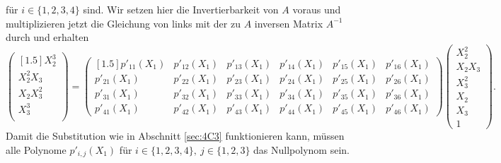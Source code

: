 \documentclass[a4paper,oneside, 11pt, openany%
]{article}
\theoremstyle{custom}
\theoremstyle{custom}
\begin{document}
für $i\in \{1,2,3,4\}$ sind.
Wir setzen hier die Invertierbarkeit von $A$ voraus und multiplizieren jetzt die Gleichung von links mit der zu $A$ inversen Matrix $A^{-1}$ durch und erhalten
\begin{equation*}
	\begin{pmatrix}[1.5]
		X_{2}^3\\
		X_{2}^2X_{3}\\
		X_{2}X_{3}^2\\
		X_{3}^3\\
	\end{pmatrix}
	=
	\begin{pmatrix}[1.5]
		p'_{11}(X_{1})&p'_{12}(X_{1})& p'_{13}(X_{1})& p'_{14}(X_{1})& p'_{15}(X_{1})& p'_{16}(X_{1})\\
		p'_{21}(X_{1})&p'_{22}(X_{1})& p'_{23}(X_{1})& p'_{24}(X_{1})& p'_{25}(X_{1})& p'_{26}(X_{1})\\
		p'_{31}(X_{1})&p'_{32}(X_{1})& p'_{33}(X_{1})& p'_{34}(X_{1})& p'_{35}(X_{1})& p'_{36}(X_{1})\\
		p'_{41}(X_{1})&p'_{42}(X_{1})& p'_{43}(X_{1})& p'_{44}(X_{1})& p'_{45}(X_{1})& p'_{46}(X_{1})
	\end{pmatrix}
	\begin{pmatrix}
		X_{2}^2\\
		X_{2}X_{3}\\
		X_{3}^2\\
		X_{2}\\
		X_{3}\\
		1
	\end{pmatrix}.
\end{equation*}
Damit die Substitution wie in Abschnitt \ref{sec:4C3} funktionieren kann, müssen alle Polynome
$p'_{i,j}(X_{1})$ für $i \in \{1,2,3,4\}, \ j \in \{1,2,3\}$ das Nullpolynom sein. 
\end{document}
